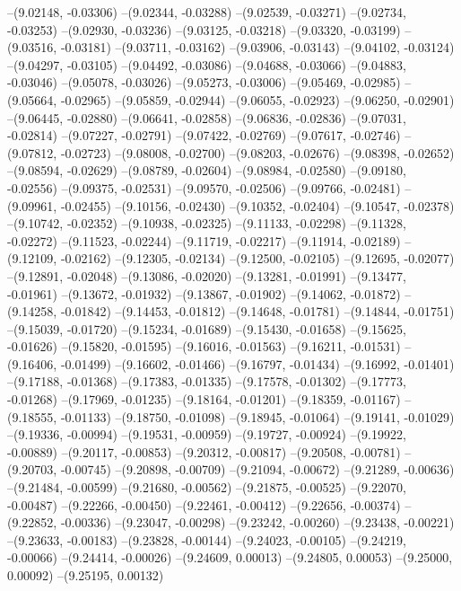 --(9.02148, -0.03306)
--(9.02344, -0.03288)
--(9.02539, -0.03271)
--(9.02734, -0.03253)
--(9.02930, -0.03236)
--(9.03125, -0.03218)
--(9.03320, -0.03199)
--(9.03516, -0.03181)
--(9.03711, -0.03162)
--(9.03906, -0.03143)
--(9.04102, -0.03124)
--(9.04297, -0.03105)
--(9.04492, -0.03086)
--(9.04688, -0.03066)
--(9.04883, -0.03046)
--(9.05078, -0.03026)
--(9.05273, -0.03006)
--(9.05469, -0.02985)
--(9.05664, -0.02965)
--(9.05859, -0.02944)
--(9.06055, -0.02923)
--(9.06250, -0.02901)
--(9.06445, -0.02880)
--(9.06641, -0.02858)
--(9.06836, -0.02836)
--(9.07031, -0.02814)
--(9.07227, -0.02791)
--(9.07422, -0.02769)
--(9.07617, -0.02746)
--(9.07812, -0.02723)
--(9.08008, -0.02700)
--(9.08203, -0.02676)
--(9.08398, -0.02652)
--(9.08594, -0.02629)
--(9.08789, -0.02604)
--(9.08984, -0.02580)
--(9.09180, -0.02556)
--(9.09375, -0.02531)
--(9.09570, -0.02506)
--(9.09766, -0.02481)
--(9.09961, -0.02455)
--(9.10156, -0.02430)
--(9.10352, -0.02404)
--(9.10547, -0.02378)
--(9.10742, -0.02352)
--(9.10938, -0.02325)
--(9.11133, -0.02298)
--(9.11328, -0.02272)
--(9.11523, -0.02244)
--(9.11719, -0.02217)
--(9.11914, -0.02189)
--(9.12109, -0.02162)
--(9.12305, -0.02134)
--(9.12500, -0.02105)
--(9.12695, -0.02077)
--(9.12891, -0.02048)
--(9.13086, -0.02020)
--(9.13281, -0.01991)
--(9.13477, -0.01961)
--(9.13672, -0.01932)
--(9.13867, -0.01902)
--(9.14062, -0.01872)
--(9.14258, -0.01842)
--(9.14453, -0.01812)
--(9.14648, -0.01781)
--(9.14844, -0.01751)
--(9.15039, -0.01720)
--(9.15234, -0.01689)
--(9.15430, -0.01658)
--(9.15625, -0.01626)
--(9.15820, -0.01595)
--(9.16016, -0.01563)
--(9.16211, -0.01531)
--(9.16406, -0.01499)
--(9.16602, -0.01466)
--(9.16797, -0.01434)
--(9.16992, -0.01401)
--(9.17188, -0.01368)
--(9.17383, -0.01335)
--(9.17578, -0.01302)
--(9.17773, -0.01268)
--(9.17969, -0.01235)
--(9.18164, -0.01201)
--(9.18359, -0.01167)
--(9.18555, -0.01133)
--(9.18750, -0.01098)
--(9.18945, -0.01064)
--(9.19141, -0.01029)
--(9.19336, -0.00994)
--(9.19531, -0.00959)
--(9.19727, -0.00924)
--(9.19922, -0.00889)
--(9.20117, -0.00853)
--(9.20312, -0.00817)
--(9.20508, -0.00781)
--(9.20703, -0.00745)
--(9.20898, -0.00709)
--(9.21094, -0.00672)
--(9.21289, -0.00636)
--(9.21484, -0.00599)
--(9.21680, -0.00562)
--(9.21875, -0.00525)
--(9.22070, -0.00487)
--(9.22266, -0.00450)
--(9.22461, -0.00412)
--(9.22656, -0.00374)
--(9.22852, -0.00336)
--(9.23047, -0.00298)
--(9.23242, -0.00260)
--(9.23438, -0.00221)
--(9.23633, -0.00183)
--(9.23828, -0.00144)
--(9.24023, -0.00105)
--(9.24219, -0.00066)
--(9.24414, -0.00026)
--(9.24609, 0.00013)
--(9.24805, 0.00053)
--(9.25000, 0.00092)
--(9.25195, 0.00132)
